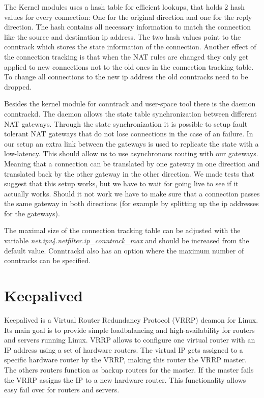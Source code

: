 \documentclass{report}
\begin{document}
The Kernel modules uses a hash table for efficient lookups, that holds 2
hash values for every connection: One for the original direction and one
for the reply direction. The hash contains all necessary information to
match the connection like the source and destination ip address. The two
hash values point to the conntrack which stores the state information of
the connection. Another effect of the connection tracking is that when
the NAT rules are changed they only get applied to new connections not
to the old ones in the connection tracking table. To change all
connections to the new ip address the old conntracks need to be dropped.

Besides the kernel module for conntrack and user-space tool there is the
daemon conntrackd. The daemon allows the state table synchronization
between different NAT gateways. Through the state synchronization it is
possible to setup fault tolerant NAT gateways that do not lose
connections in the case of an failure. In our setup an extra link
between the gateways is used to replicate the state with a low-latency.
This should allow us to use asynchronous routing with our gateways.
Meaning that a connection can be translated by one gateway in one
direction and translated back by the other gateway in the other
direction. We made tests that suggest that this setup works, but we have
to wait for going live to see if it actually works. Should it not work
we have to make sure that a connection passes the same gateway in both
directions (for example by splitting up the ip addresses for the
gateways).

The maximal size of the connection tracking table can be adjusted with
the variable \linebreak \textit{net.ipv4.netfilter.ip\_conntrack\_max} and should be
increased from the default value. Conntrackd also has an option where
the maximum number of conntracks can be specified.

\section{Keepalived}\label{keepalived}

Keepalived\cite{keepalived}  is a Virtual Router Redundancy Protocol (VRRP)\cite{vrrp} deamon
for Linux. Its main goal is to provide simple loadbalancing and
high-availability for routers and servers running Linux. VRRP allows to
configure one virtual router with an IP address using a set of hardware
routers. The virtual IP gets assigned to a specific hardware router by
the VRRP, making this router the VRRP master. The others routers
function as backup routers for the master. If the master fails the VRRP
assigns the IP to a new hardware router. This functionality allows easy
fail over for routers and servers.
\end{document}

